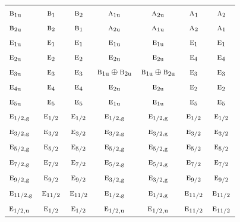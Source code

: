 \documentclass[10pt,a4paper]{article}
\numberwithin{equation}{section}
\newcommand{\irr}[1]{\text{\normalfont\scshape #1}}
\newcommand{\ptag}[1]{\mathrm{#1}}
\begin{document}
{\begin{longtable}{@{}lcccccc@{}}
$\irr{b}_{1\ptag{u}}$ & $\irr{b}_{1}$ & $\irr{b}_{2}$ & $\irr{a}_{1\ptag{u}}$ & $\irr{a}_{2\ptag{u}}$ & $\irr{a}_{1}$ & $\irr{a}_{2}$\\
$\irr{b}_{2\ptag{u}}$ & $\irr{b}_{2}$ & $\irr{b}_{1}$ & $\irr{a}_{2\ptag{u}}$ & $\irr{a}_{1\ptag{u}}$ & $\irr{a}_{2}$ & $\irr{a}_{1}$\\
$\irr{e}_{1\ptag{u}}$ & $\irr{e}_{1}$ & $\irr{e}_{1}$ & $\irr{e}_{1\ptag{u}}$ & $\irr{e}_{1\ptag{u}}$ & $\irr{e}_{1}$ & $\irr{e}_{1}$\\
$\irr{e}_{2\ptag{u}}$ & $\irr{e}_{2}$ & $\irr{e}_{2}$ & $\irr{e}_{2\ptag{u}}$ & $\irr{e}_{2\ptag{u}}$ & $\irr{e}_{4}$ & $\irr{e}_{4}$\\
$\irr{e}_{3\ptag{u}}$ & $\irr{e}_{3}$ & $\irr{e}_{3}$ & $\irr{b}_{1\ptag{u}}\oplus \irr{b}_{2\ptag{u}}$ & $\irr{b}_{1\ptag{u}}\oplus \irr{b}_{2\ptag{u}}$ & $\irr{e}_{3}$ & $\irr{e}_{3}$\\
$\irr{e}_{4\ptag{u}}$ & $\irr{e}_{4}$ & $\irr{e}_{4}$ & $\irr{e}_{2\ptag{u}}$ & $\irr{e}_{2\ptag{u}}$ & $\irr{e}_{2}$ & $\irr{e}_{2}$\\
$\irr{e}_{5\ptag{u}}$ & $\irr{e}_{5}$ & $\irr{e}_{5}$ & $\irr{e}_{1\ptag{u}}$ & $\irr{e}_{1\ptag{u}}$ & $\irr{e}_{5}$ & $\irr{e}_{5}$\\
$\irr{e}_{1/2,\ptag{g}}$ & $\irr{e}_{1/2}$ & $\irr{e}_{1/2}$ & $\irr{e}_{1/2,\ptag{g}}$ & $\irr{e}_{1/2,\ptag{g}}$ & $\irr{e}_{1/2}$ & $\irr{e}_{1/2}$\\
$\irr{e}_{3/2,\ptag{g}}$ & $\irr{e}_{3/2}$ & $\irr{e}_{3/2}$ & $\irr{e}_{3/2,\ptag{g}}$ & $\irr{e}_{3/2,\ptag{g}}$ & $\irr{e}_{3/2}$ & $\irr{e}_{3/2}$\\
$\irr{e}_{5/2,\ptag{g}}$ & $\irr{e}_{5/2}$ & $\irr{e}_{5/2}$ & $\irr{e}_{5/2,\ptag{g}}$ & $\irr{e}_{5/2,\ptag{g}}$ & $\irr{e}_{5/2}$ & $\irr{e}_{5/2}$\\
$\irr{e}_{7/2,\ptag{g}}$ & $\irr{e}_{7/2}$ & $\irr{e}_{7/2}$ & $\irr{e}_{5/2,\ptag{g}}$ & $\irr{e}_{5/2,\ptag{g}}$ & $\irr{e}_{7/2}$ & $\irr{e}_{7/2}$\\
$\irr{e}_{9/2,\ptag{g}}$ & $\irr{e}_{9/2}$ & $\irr{e}_{9/2}$ & $\irr{e}_{3/2,\ptag{g}}$ & $\irr{e}_{3/2,\ptag{g}}$ & $\irr{e}_{9/2}$ & $\irr{e}_{9/2}$\\
$\irr{e}_{11/2,\ptag{g}}$ & $\irr{e}_{11/2}$ & $\irr{e}_{11/2}$ & $\irr{e}_{1/2,\ptag{g}}$ & $\irr{e}_{1/2,\ptag{g}}$ & $\irr{e}_{11/2}$ & $\irr{e}_{11/2}$\\
$\irr{e}_{1/2,\ptag{u}}$ & $\irr{e}_{1/2}$ & $\irr{e}_{1/2}$ & $\irr{e}_{1/2,\ptag{u}}$ & $\irr{e}_{1/2,\ptag{u}}$ & $\irr{e}_{11/2}$ & $\irr{e}_{11/2}$\\

\end{longtable}}
\end{document}
